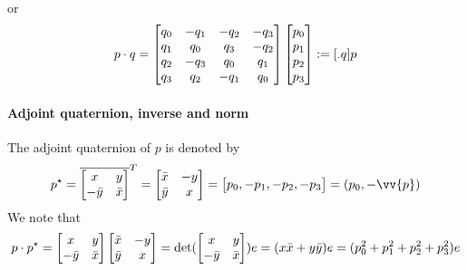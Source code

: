 or
\begin{equation}
  \label{eq:77}
  p \cdot q  = 
  \begin{bmatrix}
    q_0 & -q_1 & -q_2 & -q_3 \\
    q_1 & q_0 & q_3 & -q_2 \\
    q_2 & -q_3 & q_0 & q_1 \\
    q_3 & q_2 & -q_1 & q_0 \\
  \end{bmatrix}
  \begin{bmatrix}
    p_0\\
    p_1\\
    p_2\\
    p_3
  \end{bmatrix} := [{}_\cdot q] p
\end{equation}

\paragraph{Adjoint quaternion, inverse and norm}
The adjoint quaternion of $p$ is denoted by
\begin{equation}
  p^\star = \overline{  \begin{bmatrix}
      x &y  \\
      - \bar y  & \bar x
    \end{bmatrix}}^T
  =\begin{bmatrix}
    \bar x & - y  \\
    \bar y  &  x
  \end{bmatrix} =
  \begin{bmatrix}
    p_0, -p_1, -p_2, -p_3
  \end{bmatrix} = (p_0, - \vv{p})
\end{equation}
We note that
\begin{equation}
  \label{eq:131}
  p \cdot p^\star = 
  \begin{bmatrix}
      x &y  \\
      - \bar y  & \bar x
    \end{bmatrix}
    \begin{bmatrix}
    \bar x & - y  \\
    \bar y  &  x
  \end{bmatrix} = \det(\begin{bmatrix}
      x &y  \\
      - \bar y  & \bar x
    \end{bmatrix}) e = (x\bar x + y \bar y) e  = (p^2_0 + p^2_1+ p_2^2 + p_3^2)e
\end{equation}


